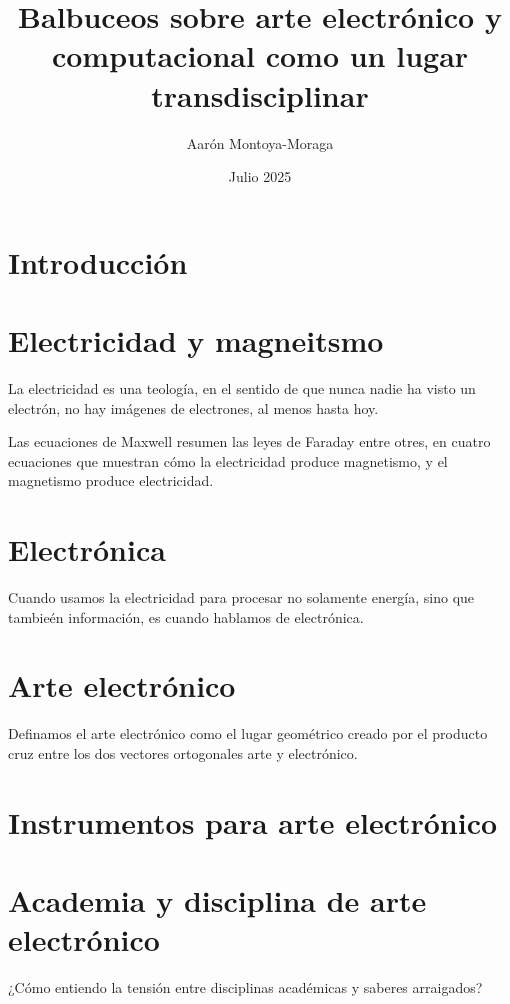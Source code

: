 \documentclass{article}
\title{Balbuceos sobre arte electrónico y computacional como un lugar transdisciplinar}
\author{Aarón Montoya-Moraga}
\date{Julio 2025}
\begin{document}
\maketitle

\renewcommand*\contentsname{Tabla de contenidos}

\tableofcontents

\section{Introducción}

\section{Electricidad y magneitsmo}

La electricidad es una teología, en el sentido de que nunca nadie ha visto un electrón, no hay imágenes de electrones, al menos hasta hoy.

Las ecuaciones de Maxwell resumen las leyes de Faraday entre otres, en cuatro ecuaciones que muestran cómo la electricidad produce magnetismo, y el magnetismo produce electricidad.

\section{Electrónica}

Cuando usamos la electricidad para procesar no solamente energía, sino que tambieén información, es cuando hablamos de electrónica.

\section{Arte electrónico}

Definamos el arte electrónico como el lugar geométrico creado por el producto cruz entre los dos vectores ortogonales arte y electrónico.

\section{Instrumentos para arte electrónico}

\section{Academia y disciplina de arte electrónico}

¿Cómo entiendo la tensión entre disciplinas académicas y saberes arraigados?
\end{document}
